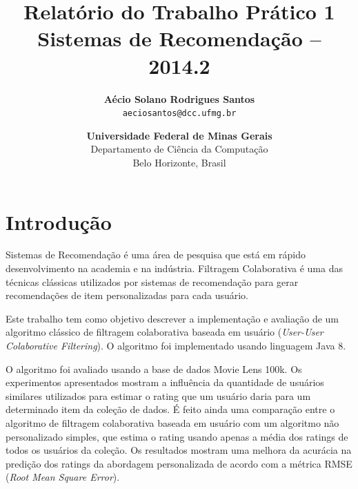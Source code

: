 \documentclass[12pt, a4paper, oneside]{article}
\begin{document}
\title{\textbf{Relatório do Trabalho Prático 1}\\
	\normalsize{Sistemas de Recomendação -- 2014.2}
}

\author{
    \textbf{Aécio Solano Rodrigues Santos}\\ 
    \small{\texttt{aeciosantos@dcc.ufmg.br}}\\
    \and
    \textbf{\small{Universidade Federal de Minas Gerais}}\\
    \small{Departamento de Ciência da Computação}\\
    \small{Belo Horizonte, Brasil}
}

\date{}

\maketitle



\section{Introdução}
\label{sec:introducao}

Sistemas de Recomendação é uma área de pesquisa que está em rápido desenvolvimento na academia e na indústria. Filtragem Colaborativa é uma das técnicas clássicas utilizados por sistemas de recomendação para gerar recomendações de item personalizadas para cada usuário.

Este trabalho tem como objetivo descrever a implementação e avaliaç\~ao de um algoritmo clássico de filtragem colaborativa baseada em usuário (\textit{User-User Colaborative Filtering}). O algoritmo foi implementado usando linguagem Java 8.

O algoritmo foi avaliado usando a base de dados Movie Lens 100k. Os experimentos apresentados mostram a influência da quantidade de usuários similares utilizados para estimar o rating que um usuário daria para um determinado item da coleção de dados. É feito ainda uma comparação entre o algoritmo de filtragem colaborativa baseada em usuário com um algoritmo não personalizado simples, que estima o rating usando apenas a média dos ratings de todos os usuários da coleção. Os resultados mostram uma melhora da acurácia na predição dos ratings da abordagem personalizada de acordo com a métrica RMSE (\textit{Root Mean Square Error}). %
\end{document}
